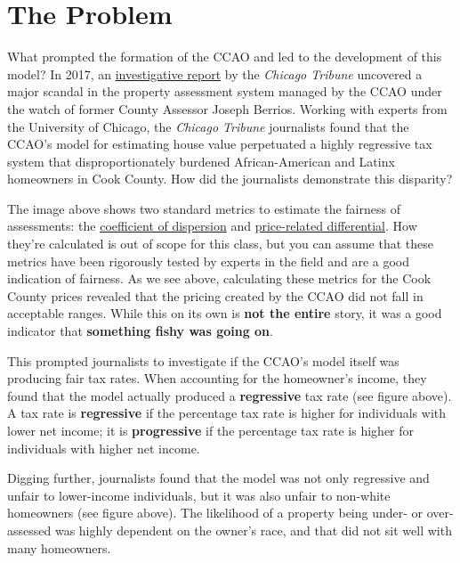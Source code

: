 \documentclass[
  letterpaper,
  DIV=11,
  numbers=noendperiod]{scrreprt}
\begin{document}
\section{The Problem}\label{the-problem}

What prompted the formation of the CCAO and led to the development of
this model? In 2017, an
\href{https://apps.chicagotribune.com/news/watchdog/cook-county-property-tax-divide/assessments.html}{investigative
report} by the \emph{Chicago Tribune} uncovered a major scandal in the
property assessment system managed by the CCAO under the watch of former
County Assessor Joseph Berrios. Working with experts from the University
of Chicago, the \emph{Chicago Tribune} journalists found that the CCAO's
model for estimating house value perpetuated a highly regressive tax
system that disproportionately burdened African-American and Latinx
homeowners in Cook County. How did the journalists demonstrate this
disparity?

The image above shows two standard metrics to estimate the fairness of
assessments: the
\href{https://www.realestateagent.com/real-estate-glossary/real-estate/coefficient-of-dispersion.html}{coefficient
of dispersion} and
\href{https://leg.wa.gov/House/Committees/FIN/Documents/2009/RatioText.pdf}{price-related
differential}. How they're calculated is out of scope for this class,
but you can assume that these metrics have been rigorously tested by
experts in the field and are a good indication of fairness. As we see
above, calculating these metrics for the Cook County prices revealed
that the pricing created by the CCAO did not fall in acceptable ranges.
While this on its own is \textbf{not the entire} story, it was a good
indicator that \textbf{something fishy was going on}.

This prompted journalists to investigate if the CCAO's model itself was
producing fair tax rates. When accounting for the homeowner's income,
they found that the model actually produced a \textbf{regressive} tax
rate (see figure above). A tax rate is \textbf{regressive} if the
percentage tax rate is higher for individuals with lower net income; it
is \textbf{progressive} if the percentage tax rate is higher for
individuals with higher net income.

Digging further, journalists found that the model was not only
regressive and unfair to lower-income individuals, but it was also
unfair to non-white homeowners (see figure above). The likelihood of a
property being under- or over-assessed was highly dependent on the
owner's race, and that did not sit well with many homeowners.
\end{document}
